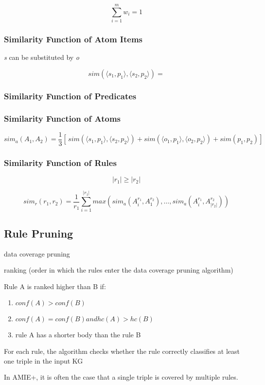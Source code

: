 $$\sum_{i = 1}^m w_{i} = 1$$

\subsubsection{Similarity Function of Atom Items}

\textit{s} can be substituted by \textit{o}

$$sim ( \langle s_{1}, p_{1} \rangle, \langle s_{2}, p_{2} \rangle ) = $$


\subsubsection{Similarity Function of Predicates}

\subsubsection{Similarity Function of Atoms}

$$sim_a(A_{1}, A_{2}) = \frac{1}{3} [ \, sim(\langle s_{1}, p_{1} \rangle, \langle s_{2}, p_{2} \rangle) + sim(\langle o_{1}, p_{1} \rangle, \langle o_{2}, p_{2} \rangle) + sim(p_{1}, p_{2}) ] \,$$

\subsubsection{Similarity Function of Rules}

$$|r_{1}| \geq |r_{2}|$$

$$ sim_{r}(r_{1}, r_{2}) = \frac{1}{r_{1}} \sum_{i = 1}^{|r_{1}|} max(sim_{a}(A_{i}^{r_{1}}, A_{1}^{r_{2}}), \ldots, sim_{a}(A_{i}^{r_{1}}, A_{|r_{2}|}^{r_{2}}))  $$

\subsection{Rule Pruning}

data coverage pruning

ranking (order in which the rules enter the data coverage pruning algorithm)

Rule A is ranked higher than B if:

\begin{enumerate}
    \item $conf(A) > conf(B)$
    \item $conf(A) = conf(B) and hc(A) > hc(B)$
    \item rule A has a shorter body than the rule B
\end{enumerate}

For each rule, the algorithm checks whether the rule correctly classifies at least one triple in the input KG

In AMIE+, it is often the case that a single triple is covered by multiple rules.


